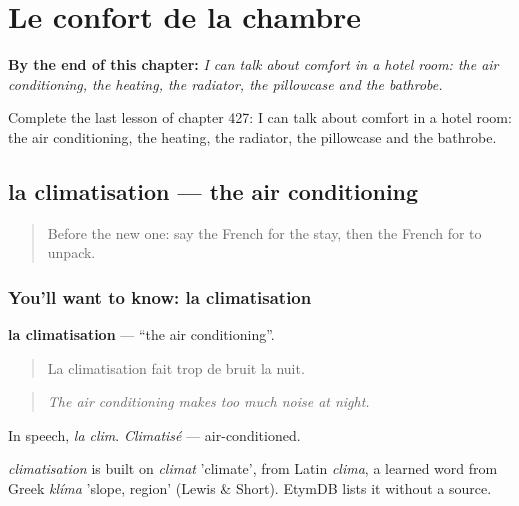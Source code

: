 
\chapter{Le confort de la chambre}
\label{ch:fr-le-confort-de-la-chambre}

\begin{chapteropening}
\textbf{By the end of this chapter:} \emph{I can talk about comfort in a hotel room: the air conditioning, the heating, the radiator, the pillowcase and the bathrobe.}

Complete the last lesson of chapter 427: I can talk about comfort in a hotel room: the air conditioning, the heating, the radiator, the pillowcase and the bathrobe.
\end{chapteropening}

\section[la climatisation]{la climatisation — the air conditioning}

\label{lesson:FR-C427-climatisation}



\begin{quote}
Before the new one: say the French for the stay, then the French for to unpack.
\end{quote}

\subsection*{You'll want to know: la climatisation}
\textbf{la climatisation} — \textquotedblleft{}the air conditioning\textquotedblright{}.

\begin{quote}
La climatisation fait trop de bruit la nuit.
\end{quote}

\begin{quote}
\emph{The air conditioning makes too much noise at night.}
\end{quote}

In speech, \emph{la clim}. \emph{Climatisé} — air-conditioned.

\begin{cousinweb}
\emph{climatisation} is built on \emph{climat} 'climate', from Latin \emph{clima}, a learned word from Greek \emph{klíma} 'slope, region' (Lewis \& Short). EtymDB lists it without a source.
\end{cousinweb}

